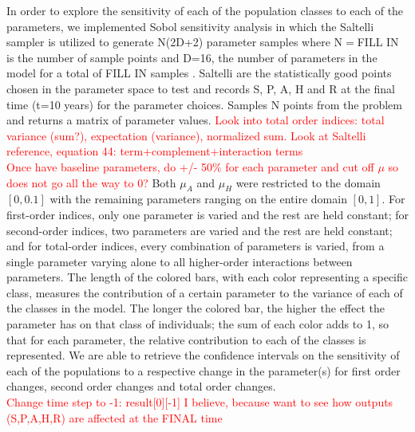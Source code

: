 \documentclass[12pt]{article}
\begin{document}
In order to explore the sensitivity of each of the population classes to each of the parameters, we implemented Sobol sensitivity analysis in which the Saltelli sampler is utilized to generate N(2D+2) parameter samples where N$=$FILL IN is the number of sample points and D=16, the number of parameters in the model for a total of FILL IN samples \cite{Herman}. 
Saltelli are the statistically good points chosen in the parameter space to test and records S, P, A, H and R at the final time (t=10 years) for the parameter choices. Samples N points from the problem and returns a matrix of parameter values. 
\textcolor{red}{Look into total order indices: total variance (sum?), expectation (variance), normalized sum. Look at Saltelli reference, equation 44: term+complement+interaction terms} \\
\textcolor{red}{Once have baseline parameters, do +/- 50\% for each parameter and cut off $\mu$ so does not go all the way to 0?}
Both $\mu_{A}$ and $\mu_{H}$ were restricted to the domain $[0,0.1]$ with the remaining parameters ranging on the entire domain $[0,1]$. For first-order indices, only one parameter is varied and the rest are held constant; for second-order indices, two parameters are varied and the rest are held constant; and for total-order indices, every combination of parameters is varied, from a single parameter varying alone to all higher-order interactions between parameters. The length of the colored bars, with each color representing a specific class, measures the contribution of a certain parameter to the variance of each of the classes in the model. The longer the colored bar, the higher the effect the parameter has on that class of individuals; the sum of each color adds to 1, so that for each parameter, the relative contribution to each of the classes is represented. We are able to retrieve the confidence intervals on the sensitivity of each of the populations to a respective change in the parameter(s) for first order changes, second order changes and total order changes. \\
\textcolor{red}{Change time step to -1: result[0][-1] I believe, because want to see how outputs (S,P,A,H,R) are affected at the FINAL time}

\end{document}
